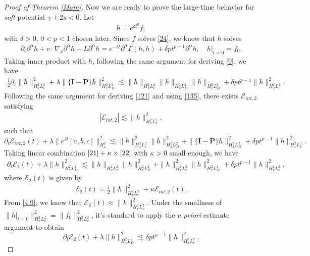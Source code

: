 \documentclass[reqno,a4paper]{amsart}
\numberwithin{equation}{section}
\newcommand{\1}{\mathbf{1}}
\renewcommand{\P}{\mathbf{P}}
\newcommand{\E}{\mathcal{E}}
\newcommand{\<}{\langle}
\renewcommand{\>}{\rangle}
\newcommand{\I}{\mathbf{I}}
\renewcommand{\P}{\mathbf{P}}
\begin{document}
\begin{proof}[Proof of Theorem \ref{Main}]
Now we are ready to prove the large-time behavior for {\em soft} potential $\gamma+2s<0$. Let 
\begin{align*}
	h = e^{\delta t^p}f,
\end{align*}
with $\delta>0$, $0<p<1$ chosen later. Since $f$ solves \eqref{24}, we know that $h$ solves 
\begin{align*}
	\partial_t{\partial^\alpha h}+v\cdot\nabla_x{\partial^\alpha h} - L {\partial^\alpha h} = e^{-\delta t}\partial^\alpha\Gamma(h,h) + \delta pt^{p-1}\partial^\alpha h,\quad h|_{t=0} = f_0. 
\end{align*}
Taking inner product with $h$, following the same argument for deriving \eqref{9}, we have 
\begin{align}\label{21}
	\frac{1}{2}\partial_t\|h\|^2_{H^2_xL^2_v} + \lambda\|\{\I-\P\}h\|_{H^2_xL^2_D}^2 \lesssim \|h\|_{H^2_xL^2_v}\|h\|_{H^2_xL^2_D}\|h\|_{H^2_xL^2_D} + \delta pt^{p-1}\|h\|^2_{H^2_xL^2_v}. 
\end{align}
Following the same argument for deriving \eqref{121} and using \eqref{135}, there exists $\E_{int,2}$ satisfying 
\begin{align}\label{4.9}
	|\E_{int,2}|\lesssim \|h\|^2_{H^2_xL^2_v},
\end{align} such that 
\begin{equation}\label{22}
	\partial_t\E_{int,2}(t) + \lambda\|e^{\delta t}[{a},{b},{c}]\|^2_{H^2_{x}}
	\lesssim \|h\|^2_{H^2_xL^2_v}\|h\|_{H^2_xL^2_D}^2+\|\{\I-\P\}{h}\|^2_{H^2_{x}L^2_D}+ \delta pt^{p-1}\|h\|^2_{H^2_xL^2_v}.
\end{equation}
Taking linear combination $\eqref{21}+\kappa\times \eqref{22}$ with $\kappa>0$ small enough, we have 
\begin{align*}
	\partial_t\E_2(t) + \lambda\|h\|_{H^2_xL^2_D}^2 \lesssim \|h\|_{H^2_xL^2_v}\|h\|^2_{H^2_xL^2_D}+\|h\|^2_{H^2_xL^2_v}\|h\|_{H^2_xL^2_D}^2 + \delta pt^{p-1}\|h\|^2_{H^2_xL^2_v},
\end{align*}
where $\E_2(t)$ is given by 
\begin{align*}
	\E_2(t) = \frac{1}{2}\|h\|^2_{H^2_xL^2_v}+\kappa\E_{int,2}(t).
\end{align*}
From \eqref{4.9}, we know that $\E_2(t)\approx \|h\|^2_{H^2_xL^2_x}$. 
Under the smallness of $\|h|_{t=0}\|^2_{H^2_xL^2_v} = \|f_0\|^2_{H^2_xL^2_v}$, it's standard to apply the {\em a priori} estimate argument to obtain
\begin{equation*}
	\partial_t\E_2(t) + \lambda\|h\|_{H^2_xL^2_D}^2 \lesssim \delta pt^{p-1}\|h\|^2_{H^2_xL^2_v}.
\end{equation*}

\end{proof}
\end{document}
